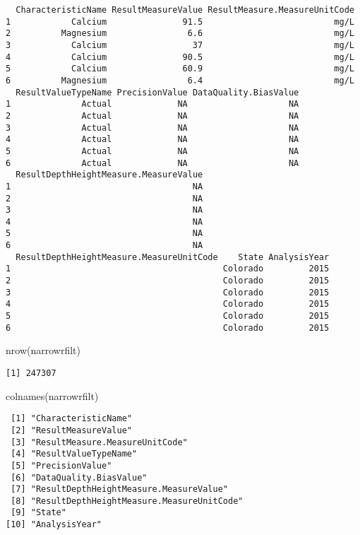 \documentclass[
  12pt,
]{article}
\newenvironment{Shaded}{\begin{snugshade}}{\end{snugshade}}
\newcommand{\FunctionTok}[1]{\textcolor[rgb]{0.28,0.35,0.67}{#1}}
\newcommand{\NormalTok}[1]{\textcolor[rgb]{0.00,0.23,0.31}{#1}}
\begin{document}
\begin{verbatim}
  CharacteristicName ResultMeasureValue ResultMeasure.MeasureUnitCode
1            Calcium               91.5                          mg/L
2          Magnesium                6.6                          mg/L
3            Calcium                 37                          mg/L
4            Calcium               90.5                          mg/L
5            Calcium               60.9                          mg/L
6          Magnesium                6.4                          mg/L
  ResultValueTypeName PrecisionValue DataQuality.BiasValue
1              Actual             NA                    NA
2              Actual             NA                    NA
3              Actual             NA                    NA
4              Actual             NA                    NA
5              Actual             NA                    NA
6              Actual             NA                    NA
  ResultDepthHeightMeasure.MeasureValue
1                                    NA
2                                    NA
3                                    NA
4                                    NA
5                                    NA
6                                    NA
  ResultDepthHeightMeasure.MeasureUnitCode    State AnalysisYear
1                                          Colorado         2015
2                                          Colorado         2015
3                                          Colorado         2015
4                                          Colorado         2015
5                                          Colorado         2015
6                                          Colorado         2015
\end{verbatim}

\begin{Shaded}
\begin{Highlighting}[]
\FunctionTok{nrow}\NormalTok{(narrowrfilt)}
\end{Highlighting}
\end{Shaded}

\begin{verbatim}
[1] 247307
\end{verbatim}

\begin{Shaded}
\begin{Highlighting}[]
\FunctionTok{colnames}\NormalTok{(narrowrfilt)}
\end{Highlighting}
\end{Shaded}

\begin{verbatim}
 [1] "CharacteristicName"                      
 [2] "ResultMeasureValue"                      
 [3] "ResultMeasure.MeasureUnitCode"           
 [4] "ResultValueTypeName"                     
 [5] "PrecisionValue"                          
 [6] "DataQuality.BiasValue"                   
 [7] "ResultDepthHeightMeasure.MeasureValue"   
 [8] "ResultDepthHeightMeasure.MeasureUnitCode"
 [9] "State"                                   
[10] "AnalysisYear"                            
\end{verbatim}
\end{document}
